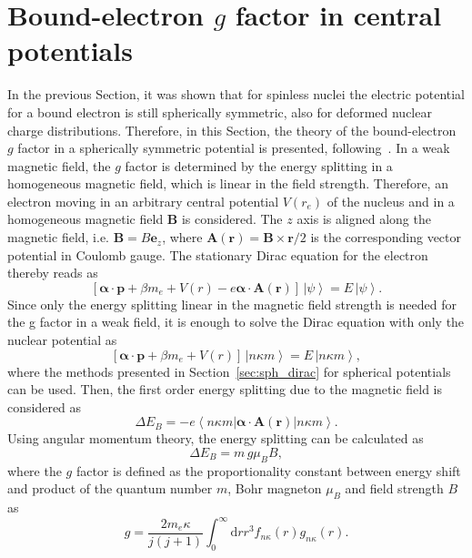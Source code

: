 \section{Bound-electron $g$ factor in central potentials}
In the previous Section, it was shown that for spinless nuclei the electric potential for a bound electron is still spherically symmetric, also for deformed nuclear charge distributions. Therefore, in this Section, the theory of the bound-electron $g$ factor in a spherically symmetric potential is presented, following~\cite{rose1961,Karshenboim2005}. In a weak magnetic field, the $g$ factor is determined by the energy splitting in a homogeneous magnetic field, which is linear in the field strength. Therefore, an electron moving in an arbitrary central potential $V(r_e)$ of the nucleus and in a homogeneous magnetic field $\mathbf{B}$ is considered. The $z$ axis is aligned along the magnetic field, i.e. $\mathbf{B}=B\mathbf{e}_z$, where $\mathbf{A}(\mathbf{r})=\mathbf{B}\times \mathbf{r} /2$ is the corresponding vector potential in Coulomb gauge. The stationary Dirac equation for the electron thereby reads as
\begin{equation}
\left[\boldsymbol{\alpha}\cdot\mathbf{p}+\beta m_e + V(r) -e\boldsymbol{\alpha}\cdot\mathbf{A}(\mathbf{r})\right]\,\left|\psi\right> = E\,\left|\psi\right>.
\end{equation}
Since only the energy splitting linear in the magnetic field strength is needed for the g factor in a weak field, it is enough to solve the Dirac equation with only the nuclear potential as
\begin{equation}
\left[\boldsymbol{\alpha}\cdot\mathbf{p}+\beta m_e + V(r) \right]\,\left|n\kappa m\right> = E\,\left|n\kappa m\right>,
\end{equation}
where the methods presented in Section~\ref{sec:sph_dirac} for spherical potentials can be used. Then, the first order energy splitting due to the magnetic field is considered as
\begin{equation}
\Delta E_B = -e\left<n\kappa m\right|\boldsymbol{\alpha}\cdot\mathbf{A}(\mathbf{r})\left|n\kappa m\right>.
\end{equation}
Using angular momentum theory, the energy splitting can be calculated as $$\Delta E_B = m\, g \mu_B B,$$ where the $g$ factor is defined as the proportionality constant between energy shift and product of the quantum number $m$, Bohr magneton $\mu_B$ and field strength $B$ as
\begin{equation}
g=\frac{2m_e\kappa}{j(j+1)}\int_0^\infty\mathrm{d}r r^3 f_{n\kappa}(r)g_{n\kappa}(r).
\label{eq:gfac_central}
\end{equation}
